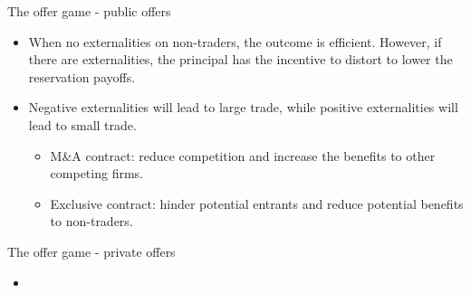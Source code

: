 \documentclass[aspectratio=169]{beamer}  %
\begin{document}
\begin{frame}{The offer game - public offers}
    \begin{itemize}
        \item When no externalities on non-traders, the outcome is efficient. However, if there are externalities, the principal has the incentive to distort to lower the reservation payoffs. \vspace{.2cm}
        \item Negative externalities will lead to large trade, while positive externalities will lead to small trade. \vspace{.2cm}
        \begin{itemize}
            \item M\&A contract: reduce competition and increase the benefits to other competing firms. \vspace{.2cm}           
            \item Exclusive contract: hinder potential entrants and reduce potential benefits to non-traders. \vspace{.2cm}
        \end{itemize}
    \end{itemize}

\end{frame}


\begin{frame}{The offer game - private offers}
    \begin{itemize}
        \item 
    \end{itemize}


\end{frame}
\end{document}
